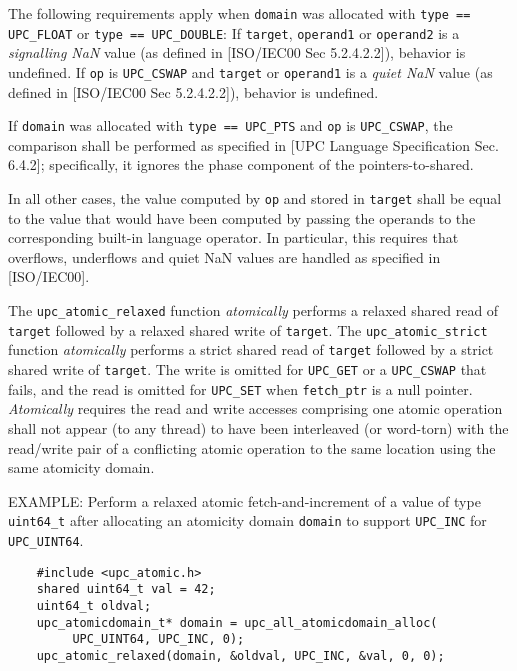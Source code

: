 \np The following requirements apply when {\tt domain} was allocated 
    with {\tt type == UPC\_FLOAT} or {\tt type == UPC\_DOUBLE}:
    If {\tt *target}, {\tt *operand1} or {\tt *operand2} is a {\em signalling NaN} value 
    (as defined in [ISO/IEC00 Sec 5.2.4.2.2]), behavior is undefined.
    If {\tt op} is {\tt UPC\_CSWAP} and {\tt *target} or {\tt *operand1} is a {\em quiet NaN} value 
    (as defined in [ISO/IEC00 Sec 5.2.4.2.2]), behavior is undefined.

\np If {\tt domain} was allocated with {\tt type == UPC\_PTS} and {\tt op} is {\tt UPC\_CSWAP},
    the comparison shall be performed as specified in [UPC Language Specification Sec. 6.4.2];
    specifically, it ignores the phase component of the pointers-to-shared.

\np In all other cases, the value computed by {\tt op} and stored in {\tt *target} 
    shall be equal to the value that would have been computed by passing the operands 
    to the corresponding built-in language operator. In particular, this requires that
    overflows, underflows and quiet NaN values are handled as specified in [ISO/IEC00].

\np The {\tt upc\_atomic\_relaxed} function {\em atomically} performs a relaxed shared read of {\tt *target} 
    followed by a relaxed shared write of {\tt *target}. 
    The {\tt upc\_atomic\_strict} function {\em atomically} performs a strict shared read of {\tt *target} 
    followed by a strict shared write of {\tt *target}. The write is omitted for {\tt UPC\_GET} 
    or a {\tt UPC\_CSWAP} that fails, 
    and the read is omitted for {\tt UPC\_SET} when {\tt fetch\_ptr} is a null pointer.
    {\em Atomically} requires the read and write accesses comprising one atomic operation shall not appear (to any thread) 
    to have been interleaved (or word-torn) with the read/write pair of a conflicting atomic operation to the same location
    using the same atomicity domain.

\np EXAMPLE: Perform a relaxed atomic fetch-and-increment of a value of type
    {\tt uint64\_t} after allocating an atomicity domain {\tt domain} to
    support {\tt UPC\_INC} for {\tt UPC\_UINT64}.
\begin{verbatim}
    #include <upc_atomic.h>
    shared uint64_t val = 42;
    uint64_t oldval;
    upc_atomicdomain_t* domain = upc_all_atomicdomain_alloc(
         UPC_UINT64, UPC_INC, 0);
    upc_atomic_relaxed(domain, &oldval, UPC_INC, &val, 0, 0);
\end{verbatim}
\vfill

